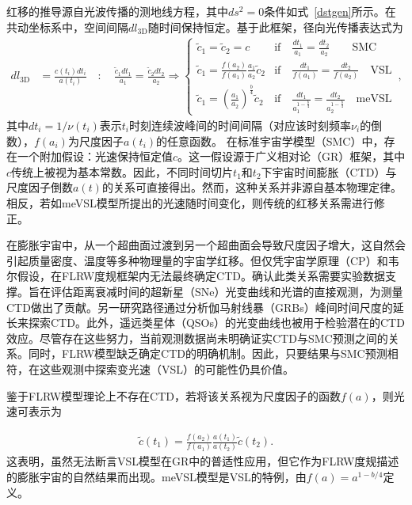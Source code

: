 \documentclass[jkps,preprint,fleqn]{revtex4}
\newcommand{\tc}{\tilde{c}}
\begin{document}
\begin{CJK*}{UTF8}{gbsn}
红移的推导源自光波传播的测地线方程，其中$ds^2 = 0$条件如式~\eqref{dstgen}所示。在共动坐标系中，空间间隔$dl_{3\textrm{D}}$随时间保持恒定\cite{Lee:2024mal,Lee:2024zcu}。基于此框架，径向光传播表达式为
\begin{align}
d l_{3\textrm{D}} &= \frac{c(t_i) dt_i}{a(t_i)} \quad : \quad \frac{\tc_1 dt_1}{a_1} = \frac{\tc_2 dt_2}{a_2} \Rightarrow \begin{cases} \tc_1 = \tc_2 = c & \textrm{if} \quad \frac{dt_1}{a_1} = \frac{dt_2}{a_2} \qquad \textrm{SMC} \\
\tc_1 = \frac{f(a_2)}{f(a_1)} \frac{a_1}{a_2} \tc_2 & \textrm{if} \quad \frac{dt_1}{f(a_1)} = \frac{dt_2}{f(a_2)} \quad \textrm{VSL} \\ \tc_1 = \left( \frac{a_1}{a_2}\right)^{\frac{b}{4}} \tc_2 & \textrm{if} \quad \frac{dt_1}{a_1^{1-\frac{b}{4}}} = \frac{dt_2}{a_2^{1-\frac{b}{4}}} \quad \textrm{meVSL}  \end{cases} \,, \label{dl3D}
\end{align}
其中$dt_i = 1/\nu(t_i)$表示$t_i$时刻连续波峰间的时间间隔（对应该时刻频率$\nu_i$的倒数），$f(a_i)$为尺度因子$a(t_i)$的任意函数。
在标准宇宙学模型（SMC）中，存在一个附加假设：光速保持恒定值$c$。这一假设源于广义相对论（GR）框架，其中$c$传统上被视为基本常数。因此，不同时间切片$t_1$和$t_2$下宇宙时间膨胀（CTD）与尺度因子倒数$a(t)$的关系可直接得出。然而，这种关系并非源自基本物理定律。相反，若如meVSL模型所提出的光速随时间变化，则传统的红移关系需进行修正。

在膨胀宇宙中，从一个超曲面过渡到另一个超曲面会导致尺度因子增大，这自然会引起质量密度、温度等多种物理量的宇宙学红移。但仅凭宇宙学原理（CP）和韦尔假设，在FLRW度规框架内无法最终确定CTD。确认此类关系需要实验数据支撑。旨在评估距离衰减时间的超新星（SNe）光变曲线和光谱的直接观测，为测量CTD做出了贡献\cite{Leibundgut:1996qm,SupernovaSearchTeam:1997gem,Foley:2005qu,Blondin:2007ua,Blondin:2008mz,Lee:2023ucu,DES:2024vgg,Lee:2024kxa}。另一研究路径通过分析伽马射线暴（GRBs）峰间时间尺度的延长来探索CTD\cite{Norris:1993hda,Wijers:1994qf,Band:1994ee,Meszaros:1995gj,Lee:1996zu,Chang:2001fy,Crawford:2009be,Zhang:2013yna,Singh:2021jgr}。此外，遥远类星体（QSOs）的光变曲线也被用于检验潜在的CTD效应\cite{Hawkins:2001be,Dai:2012wp,Lewis:2023jab}。尽管存在这些努力，当前观测数据尚未明确证实CTD与SMC预测之间的关系。同时，FLRW模型缺乏确定CTD的明确机制。因此，只要结果与SMC预测相符，在这些观测中探索变光速（VSL）的可能性仍具价值。

鉴于FLRW模型理论上不存在CTD，若将该关系视为尺度因子的函数$f(a)$，则光速可表示为

\begin{align} \tc(t_1) = \frac{f(a_2)}{f(a_1)} \frac{a(t_1)}{a(t_2)} \tc(t_2) \label{cVSL}. \end{align}这表明，虽然无法断言VSL模型在GR中的普适性应用，但它作为FLRW度规描述的膨胀宇宙的自然结果而出现。meVSL模型是VSL的特例，由$f(a) = a^{1-b/4}$定义\cite{Lee:2020zts,Lee:2023bjz}。

\end{CJK*}
\end{document}
